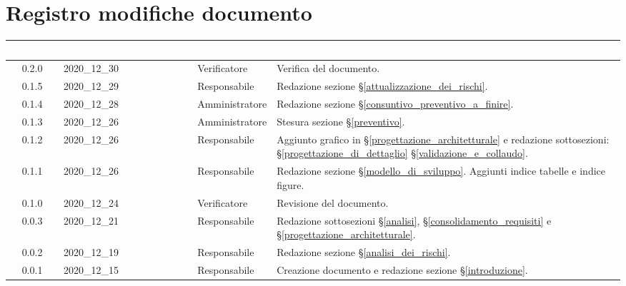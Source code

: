 \section*{Registro modifiche documento}
{

     
\renewcommand{\arraystretch}{1.5}
\centering
\begin{longtable}{ c c  C{3cm} C{3cm} C{3.2cm}}


 \textcolor{white}{\textbf{Versione}}&
    \textcolor{white}{\textbf{Data}}&
    \textcolor{white}{\textbf{Nominativo}}&
    \textcolor{white}{\textbf{Ruolo}}&
    \textcolor{white}{\textbf{Descrizione}}\\	
    \endhead

	0.2.0 & 2020\_12\_30 & \TG{} & Verificatore & Verifica del documento.\\

    0.1.5 & 2020\_12\_29 & \MM{} & Responsabile & Redazione sezione \S\ref{attualizzazione_dei_rischi}. \\

    0.1.4 & 2020\_12\_28 & \PC{} & Amministratore & Redazione sezione \S\ref{consuntivo_preventivo_a_finire}. \\

    0.1.3 & 2020\_12\_26 & \PC{} & Amministratore & Stesura sezione \S\ref{preventivo}. \\

    0.1.2 & 2020\_12\_26 & \MM{} & Responsabile & Aggiunto grafico in \S\ref{progettazione_architetturale} e redazione sottosezioni:  \S\ref{progettazione_di_dettaglio} \S\ref{validazione_e_collaudo}. \\

    0.1.1 & 2020\_12\_26 & \MM{} & Responsabile & Redazione sezione \S\ref{modello_di_sviluppo}. Aggiunti indice tabelle e indice figure. \\

    0.1.0 & 2020\_12\_24 & \PC{} & Verificatore & Revisione del documento.\\

    0.0.3 & 2020\_12\_21 & \MM{} & Responsabile & Redazione sottosezioni \S\ref{analisi}, \S\ref{consolidamento_requisiti} e \S\ref{progettazione_architetturale}. \\

    0.0.2 & 2020\_12\_19 & \MM{} & Responsabile & Redazione sezione \S\ref{analisi_dei_rischi}.\\

    0.0.1 & 2020\_12\_15 & \MM{} & Responsabile & Creazione documento e redazione sezione \S\ref{introduzione}.
			
\end{longtable}
}